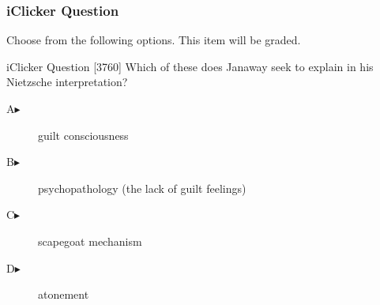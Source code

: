\begin{frame}
  \frametitle{iClicker Question}
Choose from the following options. This item will be graded.
\begin{block}{iClicker Question}
[3760] Which of these does Janaway seek to explain in his Nietzsche interpretation?
\end{block}
\begin{description}
\item[A\hspace{.2in}$\blacktriangleright$] guilt consciousness
\item[B\hspace{.2in}$\blacktriangleright$] psychopathology (the lack of guilt feelings)
\item[C\hspace{.2in}$\blacktriangleright$] scapegoat mechanism
\item[D\hspace{.2in}$\blacktriangleright$] atonement
\end{description}
\end{frame}
